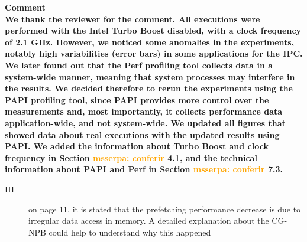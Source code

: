 \documentclass{article}
\newcounter{answer}
\newenvironment{answer}
{ \refstepcounter{answer}\vspace{0.5cm}\bfseries\noindent Comment~\theanswer\\ }
{ \vspace{0.5cm} }
\newcommand{\ms}[1]{\textcolor{orange}{\textbf{ msserpa: #1} }\vspace{0.2cm}}
\newcommand{\dcs}[1]{\textcolor{ForestGreen}{\textbf{dcsantos: #1} }\vspace{0.2cm}}
\begin{document}
\begin{answer}

We thank the reviewer for the comment. All executions were performed with the Intel Turbo Boost disabled, with a clock frequency of 2.1 GHz. However, we noticed some anomalies in the experiments, notably high variabilities (error bars) in some applications for the IPC. We later found out that the Perf profiling tool collects data in a system-wide manner, meaning that system processes may interfere in the results. We decided therefore to rerun the experiments using the PAPI profiling tool, since PAPI provides more control over the measurements and, most importantly, it collects performance data application-wide, and not system-wide. We updated all figures that showed data about real executions with the updated results using PAPI. We added the information about Turbo Boost and clock frequency in Section \ms{conferir}4.1, and the technical information about PAPI and Perf in Section \ms{conferir}7.3.






\end{answer}

\begin{description}
    \item[III] on page 11, it is stated that the prefetching performance decrease is due to irregular data access in memory. A detailed explanation about the CG-NPB could help to understand why this happened
\end{description}
\end{document}
